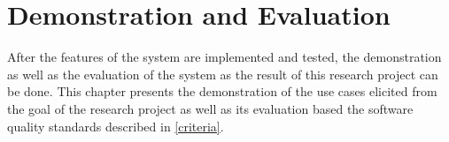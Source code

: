 \chapter{Demonstration and Evaluation}

  After the features of the system are implemented and tested, the demonstration as well as the evaluation of the system as the result of this research project can be done. This chapter presents the demonstration of the use cases elicited from the goal of the research project as well as its evaluation based the software quality standards described in \autoref{criteria}.

  
  
